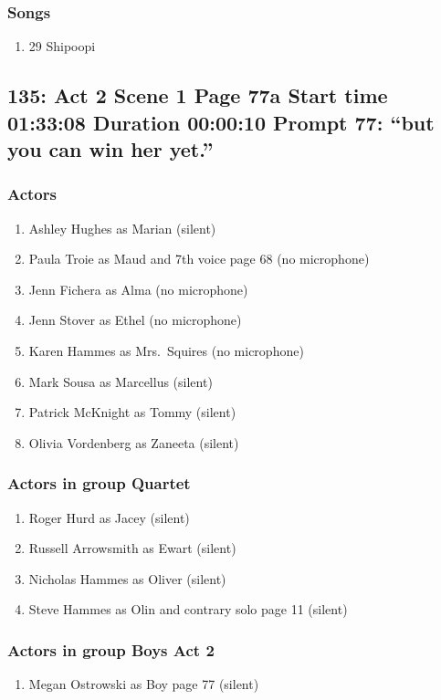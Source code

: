 \subsubsection{Songs}
\begin{enumerate}
\item 29 Shipoopi
\end{enumerate}
\subsection{135: Act 2 Scene 1 Page 77a Start time 01:33:08 Duration 00:00:10 Prompt 77: ``but you can win her yet.''}

\subsubsection{Actors}
\begin{enumerate}
\item Ashley Hughes as Marian (silent)
\item Paula Troie as Maud and 7th voice page 68 (no microphone)
\item Jenn Fichera as Alma (no microphone)
\item Jenn Stover as Ethel (no microphone)
\item Karen Hammes as Mrs.~Squires (no microphone)
\item Mark Sousa as Marcellus (silent)
\item Patrick McKnight as Tommy (silent)
\item Olivia Vordenberg as Zaneeta (silent)
\end{enumerate}
\subsubsection{Actors in group Quartet}
\begin{enumerate}
\item Roger Hurd as Jacey (silent)
\item Russell Arrowsmith as Ewart (silent)
\item Nicholas Hammes as Oliver (silent)
\item Steve Hammes as Olin and contrary solo page 11 (silent)
\end{enumerate}
\subsubsection{Actors in group Boys Act 2}
\begin{enumerate}
\item Megan Ostrowski as Boy page 77 (silent)
\end{enumerate}

